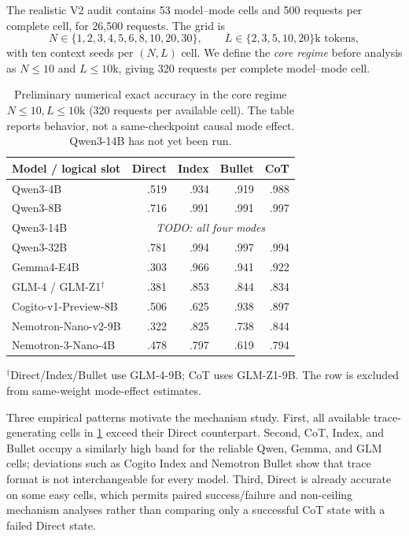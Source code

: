 The realistic V2 audit contains 53 model--mode cells and 500 requests per complete cell, for 26,500 requests. The grid is
\[
N\in\{1,2,3,4,5,6,8,10,20,30\},
\qquad
L\in\{2,3,5,10,20\}\text{k tokens},
\]
with ten context seeds per \((N,L)\) cell. We define the \emph{core regime} before analysis as \(N\leq10\) and \(L\leq10\)k, giving 320 requests per complete model--mode cell.

\begin{table}[H]
\centering
\small
\caption{Preliminary numerical exact accuracy in the core regime \(N\leq10,L\leq10\)k (320 requests per available cell). The table reports behavior, not a same-checkpoint causal mode effect. Qwen3-14B has not yet been run.}
\label{tab:core-behavior}
\begin{tabular}{@{}lrrrr@{}}
\toprule
Model / logical slot & Direct & Index & Bullet & CoT \\
\midrule
Qwen3-4B                  & .519 & .934 & .919 & .988 \\
Qwen3-8B                  & .716 & .991 & .991 & .997 \\
Qwen3-14B                 & \multicolumn{4}{c}{\textit{TODO: all four modes}} \\
Qwen3-32B                 & .781 & .994 & .997 & .994 \\
Gemma4-E4B                & .303 & .966 & .941 & .922 \\
GLM-4 / GLM-Z1\({}^\dagger\) & .381 & .853 & .844 & .834 \\
Cogito-v1-Preview-8B      & .506 & .625 & .938 & .897 \\
Nemotron-Nano-v2-9B       & .322 & .825 & .738 & .844 \\
Nemotron-3-Nano-4B        & .478 & .797 & .619 & .794 \\
\bottomrule
\end{tabular}
\vspace{0.25em}

\parbox{.94\textwidth}{\footnotesize \({}^\dagger\)Direct/Index/Bullet use GLM-4-9B; CoT uses GLM-Z1-9B. The row is excluded from same-weight mode-effect estimates.}
\end{table}

Three empirical patterns motivate the mechanism study. First, all available trace-generating cells in \cref{tab:core-behavior} exceed their Direct counterpart. Second, CoT, Index, and Bullet occupy a similarly high band for the reliable Qwen, Gemma, and GLM cells; deviations such as Cogito Index and Nemotron Bullet show that trace format is not interchangeable for every model. Third, Direct is already accurate on some easy cells, which permits paired success/failure and non-ceiling mechanism analyses rather than comparing only a successful CoT state with a failed Direct state.

